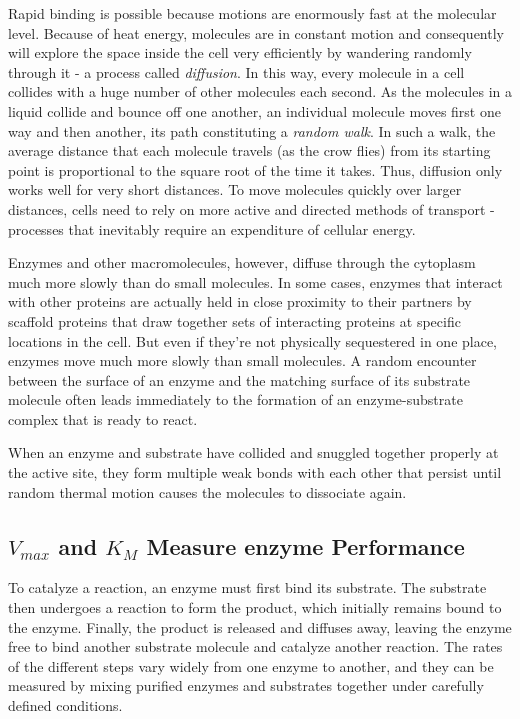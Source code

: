 Rapid binding is possible because motions are enormously fast at the
molecular level. Because of heat energy, molecules are in constant
motion and consequently will explore the space inside the cell very efficiently
by wandering randomly through it - a process called \textit{diffusion}. In
this way, every molecule in a cell collides with a huge number of other
molecules each second. As the molecules in a liquid collide and bounce
off one another, an individual molecule moves first one way and then
another, its path constituting a \textit{random walk}. In such a walk,
the average distance that each molecule travels (as the crow flies) from
its starting point is proportional to the square root of the time it takes.
Thus, diffusion only works well for very short distances. To move molecules
quickly over larger distances, cells need to rely on more active
and directed methods of transport - processes that inevitably require an
expenditure of cellular energy.

Enzymes and other macromolecules, however, diffuse through the cytoplasm
much more slowly than do small molecules. In some cases, enzymes
that interact with other proteins are actually held in close proximity to
their partners by scaffold proteins that draw together sets of interacting
proteins at specific locations in the cell. But even if they’re not physically
sequestered in one place, enzymes move much more slowly than
small molecules. A random encounter between the surface of an enzyme and the matching
surface of its substrate molecule often leads immediately to the formation of
an enzyme-substrate complex that is ready to react.

When an enzyme and substrate have collided and snuggled together
properly at the active site, they form multiple weak bonds with each
other that persist until random thermal motion causes the molecules to
dissociate again.

\subsection{$V_{max}$ and $K_{M}$ Measure enzyme Performance}

To catalyze a reaction, an enzyme must first bind its substrate. The substrate
then undergoes a reaction to form the product, which initially
remains bound to the enzyme. Finally, the product is released and diffuses
away, leaving the enzyme free to bind another substrate molecule
and catalyze another reaction. The rates of the different
steps vary widely from one enzyme to another, and they can be measured
by mixing purified enzymes and substrates together under carefully
defined conditions.

